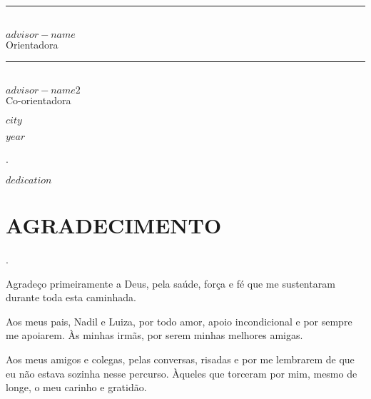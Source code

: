 \centering
\rule{6cm}{0.4pt} \\
$advisor-name$ \\
Orientadora



\vspace{0.5cm}

\centering
\rule{6cm}{0.4pt} \\
$advisor-name2$ \\
Co-orientadora

\vspace{2.0cm}

\begin{center}

$city$ 

$year$
    
\end{center}
\newpage



\begin{invisible}
.
\end{invisible}

\vspace{28\baselineskip}

\begin{adjustwidth}{7.5cm}{0cm}
    \justifying
    \singlespacing
    $dedication$
\end{adjustwidth}


\newpage
\pagestyle{fancy}

\newcommand{\resumo}{%
\titleformat{\section}[block]{\bfseries\filcenter}{}{1em}{}
}
\resumo

\section*{AGRADECIMENTO}
\justify

\begin{invisible}
.
\end{invisible}

Agradeço primeiramente a Deus, pela saúde, força e fé que me sustentaram durante toda esta caminhada.

Aos meus pais, Nadil e Luiza, por todo amor, apoio incondicional e por sempre me apoiarem. Às minhas irmãs, por serem minhas melhores amigas.

Aos meus amigos e colegas, pelas conversas, risadas e por me lembrarem de que eu não estava sozinha nesse percurso. Àqueles que torceram por mim, mesmo de longe, o meu carinho e gratidão.

